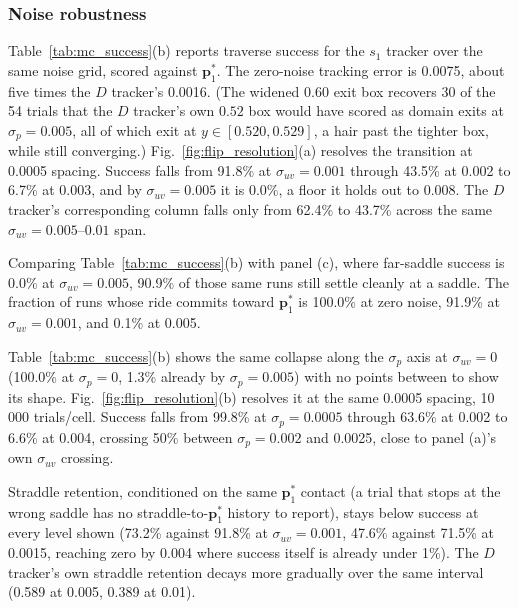 \documentclass[lettersize,journal]{IEEEtran}
\begin{document}
\subsubsection{Noise robustness}
Table~\ref{tab:mc_success}(b) reports traverse success for the $s_1$
tracker over the same noise grid, scored against $\mathbf{p}^*_1$. The
zero-noise tracking error is 0.0075, about five times the $D$ tracker's
0.0016. (The widened $0.60$ exit box recovers
30 of the 54 trials that the $D$ tracker's own $0.52$ box would have
scored as domain exits at $\sigma_p = 0.005$, all of which exit at $y
\in [0.520, 0.529]$, a hair past the tighter box, while still
converging.) Fig.~\ref{fig:flip_resolution}(a)
resolves the transition at 0.0005 spacing. Success falls from 91.8\% at
$\sigma_{uv} = 0.001$ through 43.5\% at 0.002 to 6.7\% at 0.003, and by
$\sigma_{uv} = 0.005$ it is 0.0\%, a floor it holds out to 0.008. The
$D$ tracker's corresponding column falls only from 62.4\% to 43.7\%
across the same $\sigma_{uv} = 0.005$--$0.01$ span.

Comparing Table~\ref{tab:mc_success}(b) with panel (c), where
far-saddle success is 0.0\% at $\sigma_{uv} = 0.005$, 90.9\% of those
same runs still settle cleanly at a saddle. The fraction of runs whose
ride commits toward $\mathbf{p}^*_1$ is 100.0\% at zero noise, 91.9\%
at $\sigma_{uv} = 0.001$, and 0.1\% at 0.005.

Table~\ref{tab:mc_success}(b) shows the same collapse along the
$\sigma_p$ axis at $\sigma_{uv} = 0$ (100.0\% at $\sigma_p = 0$, 1.3\%
already by $\sigma_p = 0.005$) with no points between to show its
shape. Fig.~\ref{fig:flip_resolution}(b) resolves it at the same
0.0005 spacing, 10\,000 trials/cell. Success falls from 99.8\% at
$\sigma_p = 0.0005$ through 63.6\% at 0.002 to 6.6\% at 0.004,
crossing 50\% between $\sigma_p = 0.002$ and 0.0025, close to panel
(a)'s own $\sigma_{uv}$ crossing.

Straddle retention, conditioned on the same $\mathbf{p}^*_1$ contact
(a trial that stops at the wrong saddle has no straddle-to-$\mathbf{p}^*_1$
history to report), stays below success at every level shown
(73.2\% against 91.8\% at $\sigma_{uv} = 0.001$, 47.6\% against 71.5\%
at 0.0015, reaching zero by 0.004 where success itself is already under
1\%). The $D$ tracker's own straddle retention decays more gradually
over the same interval (0.589 at 0.005, 0.389 at 0.01).
\end{document}
